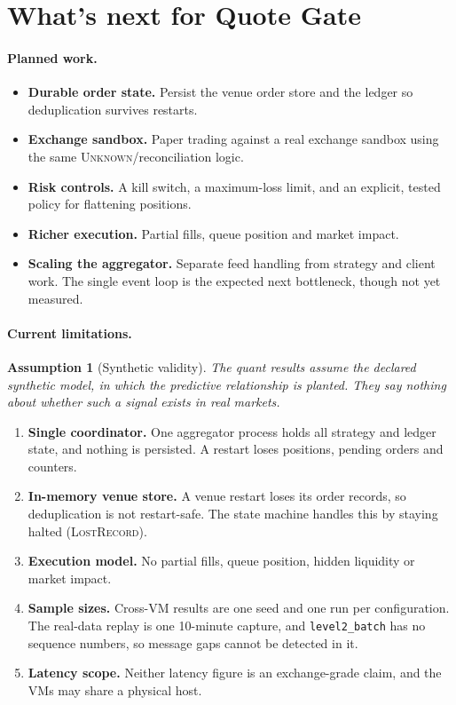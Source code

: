 \documentclass[11pt]{article}
\newtheorem{assumption}{Assumption}
\theoremstyle{remark}
\newcommand{\code}[1]{\texttt{#1}}
\begin{document}
\section*{What's next for Quote Gate}

\paragraph{Planned work.}
\begin{itemize}[leftmargin=1.5em, itemsep=2pt]
  \item \textbf{Durable order state.} Persist the venue order store and the ledger so
        deduplication survives restarts.
  \item \textbf{Exchange sandbox.} Paper trading against a real exchange sandbox using the same
        \textsc{Unknown}/reconciliation logic.
  \item \textbf{Risk controls.} A kill switch, a maximum-loss limit, and an explicit, tested
        policy for flattening positions.
  \item \textbf{Richer execution.} Partial fills, queue position and market impact.
  \item \textbf{Scaling the aggregator.} Separate feed handling from strategy and client work.
        The single event loop is the expected next bottleneck, though not yet measured.
\end{itemize}

\paragraph{Current limitations.}

\begin{assumption}[Synthetic validity]
The quant results assume the declared synthetic model, in which the predictive relationship is
planted. They say nothing about whether such a signal exists in real markets.
\end{assumption}

\begin{enumerate}[leftmargin=1.5em, itemsep=2pt]
  \item \textbf{Single coordinator.} One aggregator process holds all strategy and ledger
        state, and nothing is persisted. A restart loses positions, pending orders and
        counters.
  \item \textbf{In-memory venue store.} A venue restart loses its order records, so
        deduplication is not restart-safe. The state machine handles this by staying halted
        (\textsc{LostRecord}).
  \item \textbf{Execution model.} No partial fills, queue position, hidden liquidity or market
        impact.
  \item \textbf{Sample sizes.} Cross-VM results are one seed and one run per configuration.
        The real-data replay is one 10-minute capture, and \code{level2\_batch} has no sequence
        numbers, so message gaps cannot be detected in it.
  \item \textbf{Latency scope.} Neither latency figure is an exchange-grade claim, and the VMs
        may share a physical host.
\end{enumerate}
\end{document}
